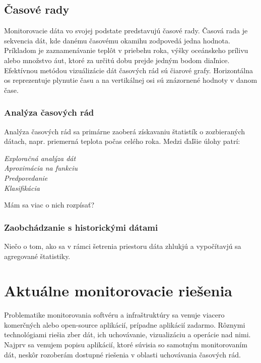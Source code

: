 \documentclass[11pt,final,oneside]{fithesis}
\begin{document}
\section{Časové rady}
Monitorovacie dáta vo svojej podstate predstavujú časové rady.
Časová rada je sekvencia dát, kde danému časovému okamihu zodpovedá jedna hodnota. Príkladom je zaznamenávanie teplôt v priebehu roka, výšky oceánskeho prílivu alebo množstvo áut, ktoré za určitú dobu
prejde jedným bodom diaľnice. Efektívnou metódou vizuálizácie dát časových rád sú čiarové grafy. Horizontálna os reprezentuje plynutie času a na vertikálnej osi sú znázornené hodnoty v danom čase.

\subsection{Analýza časových rád}
Analýza časových rád sa primárne zaoberá získavaniu štatistík o zozbieraných dátach, napr. priemerná teplota počas celého roka. Medzi ďaľšie úlohy patrí:
\begin{description}
\item[\emph{Exploračná analýza dát}]
\item[\emph{Aproximácia na funkciu}] 
\item[\emph{Predpovedanie}] 
\item[\emph{Klasifikácia}] 
\end{description}
Mám sa viac o nich rozpísať?

\subsection{Zaobchádzanie s historickými dátami}
Niečo o tom, ako sa v rámci šetrenia priestoru dáta zhlukjú a vypočítavjú sa agregované štatistiky.

\chapter{Aktuálne monitorovacie riešenia}
Problematike monitorovania softvéru a infraštruktúry sa venuje viacero komerčných alebo open-source aplikácií, prípadne aplikácií zadarmo. Rôznymi technológiami riešia zber dát, ich uchovávanie, vizualizáciu a operácie nad
nimi. Najprv sa venujem popisu aplikácií, ktoré súvisia so samotným monitorovaním dát, neskôr rozoberám dostupné riešenia v oblasti uchovávania časových rád.
\end{document}
